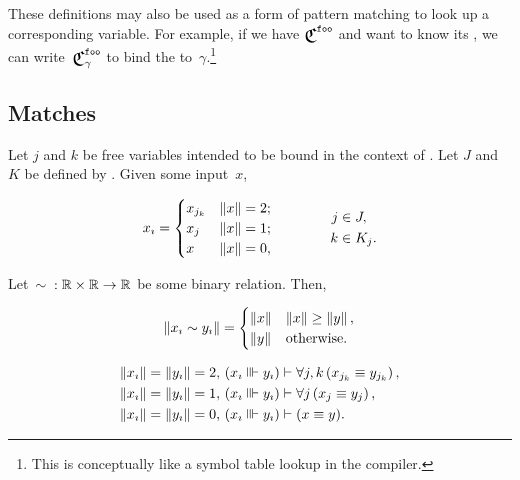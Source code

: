 These definitions may also be used as a form of pattern matching to look up
  a corresponding variable.
For example,
  if we have $\Classify^\texttt{foo}$ and want to know its ,
    we can write~$\Classify^\texttt{foo}_\gamma$ to bind the
     to~$\gamma$.\footnote{%
      This is conceptually like a symbol table lookup in the compiler.}


\subsection{Matches}
\begin{axiom}
  Let $j$ and $k$ be free variables intended to be bound in the
    context of .
  Let $J$ and $K$ be defined by .
  Given some input~$x$,

  \begin{equation*}
    {x}_{\imath} =
      \begin{cases}
        x_{j_k} &\left\|x\right\| = 2; \\
        x_j     &\left\|x\right\| = 1; \\
        x       &\left\|x\right\| = 0,
      \end{cases}
    \qquad\qquad
    \begin{aligned}
      j&\in J, \\
      k&\in K_j.
    \end{aligned}
  \end{equation*}
\end{axiom}

\begin{axiom}
  Let~$\sim{} : \mathbb{R}\times\mathbb{R}\rightarrow\mathbb{R}$ be some binary relation.
  Then,

  \begin{equation*}
    \left\|{x}_{\imath} \sim {y}_{\imath}\right\| =
      \begin{cases}
        \left\|x\right\| &\left\|x\right\| \geq \left\|y\right\|, \\
        \left\|y\right\| &\text{otherwise}.
      \end{cases}
  \end{equation*}
\end{axiom}

\def\xyequivish{\varsub x\equivish \varsub y}

\begin{axiom}
\indexsym{}
  \begin{align*}
    \rank{\varsub x}=\rank{\varsub y}=2,\,
      (\xyequivish) &\infer \Forall{j,k}{x_{j_k} \equiv y_{j_k}}, \\
    \rank{\varsub x}=\rank{\varsub y}=1,\,
      (\xyequivish) &\infer \Forall{j}{x_j \equiv y_j}, \\
    \rank{\varsub x}=\rank{\varsub y}=0,\,
      (\xyequivish) &\infer (x\equiv y).
  \end{align*}
\end{axiom}

